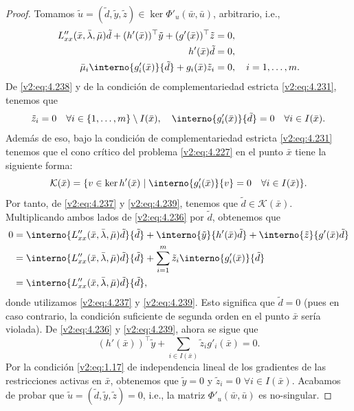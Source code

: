 \begin{proof}
Tomamos $\tilde{u} = (\tilde{d}, \tilde{y}, \tilde{z}) \in \ker \Phi'_u(\bar{w}, \bar{u})$, arbitrario, i.e.,
\begin{align}
L''_{xx}(\bar{x}, \bar{\lambda}, \bar{\mu})\tilde{d} + (h'(\bar{x}))^\top\tilde{y} + (g'(\bar{x}))^\top\tilde{z} &= 0, \label{v2:eq:4.236} \\
h'(\bar{x})\tilde{d} &= 0, \label{v2:eq:4.237} \\
\bar{\mu}_i \interno{g'_i(\bar{x})}{\tilde{d}} + g_i(\bar{x})\tilde{z}_i &= 0, \quad i = 1, \dots, m. \label{v2:eq:4.238}
\end{align}
De \eqref{v2:eq:4.238} y de la condición de complementariedad estricta \eqref{v2:eq:4.231}, tenemos que
\begin{equation}
\tilde{z}_i = 0 \quad \forall i \in \{ 1, \dots, m \} \setminus I(\bar{x}), \quad \interno{g'_i(\bar{x})}{\tilde{d}} = 0 \quad \forall i \in I(\bar{x}).
\label{v2:eq:4.239}
\end{equation}
Además de eso, bajo la condición de complementariedad estricta \eqref{v2:eq:4.231} tenemos que el cono crítico del problema \eqref{v2:eq:4.227} en el punto $\bar{x}$ tiene la siguiente forma:
\begin{equation}
\mathcal{K}(\bar{x}) = \{ v \in \ker h'(\bar{x}) \mid \interno{g'_i(\bar{x})}{v} = 0 \quad \forall i \in I(\bar{x}) \}.
\label{v2:eq:4.240}
\end{equation}
Por tanto, de \eqref{v2:eq:4.237} y \eqref{v2:eq:4.239}, tenemos que $\tilde{d} \in \mathcal{K}(\bar{x})$. Multiplicando ambos lados de \eqref{v2:eq:4.236} por $\tilde{d}$, obtenemos que
\begin{align*}
0 &= \interno{L''_{xx}(\bar{x}, \bar{\lambda}, \bar{\mu})\tilde{d}}{\tilde{d}} + \interno{\tilde{y}}{h'(\bar{x})\tilde{d}} + \interno{\tilde{z}}{g'(\bar{x})\tilde{d}} \\
&= \interno{L''_{xx}(\bar{x}, \bar{\lambda}, \bar{\mu})\tilde{d}}{\tilde{d}} + \sum_{i=1}^m \tilde{z}_i \interno{g'_i(\bar{x})}{\tilde{d}} \\
&= \interno{L''_{xx}(\bar{x}, \bar{\lambda}, \bar{\mu})\tilde{d}}{\tilde{d}},
\end{align*}
donde utilizamos \eqref{v2:eq:4.237} y \eqref{v2:eq:4.239}.
Esto significa que $\tilde{d} = 0$ (pues en caso contrario, la condición suficiente de segunda orden en el punto $\bar{x}$ sería violada). De \eqref{v2:eq:4.236} y \eqref{v2:eq:4.239}, ahora se sigue que
\[
(h'(\bar{x}))^\top\tilde{y} + \sum_{i \in I(\bar{x})} \tilde{z}_i g'_i(\bar{x}) = 0.
\]
Por la condición \eqref{v2:eq:1.17} de independencia lineal de los gradientes de las restricciones activas en $\bar{x}$, obtenemos que $\tilde{y} = 0$ y $\tilde{z}_i = 0$ $\forall i \in I(\bar{x})$. Acabamos de probar que $\tilde{u} = (\tilde{d}, \tilde{y}, \tilde{z}) = 0$, i.e., la matriz $\Phi'_u(\bar{w}, \bar{u})$ es no-singular.


\end{proof}
